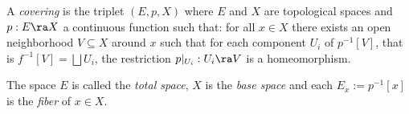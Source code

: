 \begin{defin*}
  A \emph{covering} is the triplet $(E,p,X)$ where $E$ and $X$ are topological spaces and
  $p:E\ra X$ a continuous function such that: for all $x\in X$ there exists an open
  neighborhood $V\subseteq X$ around $x$ such that for each component $U_i$ of $p^{-1}[V]$,
  that is $f^{-1}[V]=\bigsqcup U_i$, the restriction $p|_{U_i}:U_i\ra V$ is a homeomorphism.

  The space $E$ is called the \emph{total space}, $X$ is the \emph{base space} and
  each $E_x:=p^{-1}[x]$ is the \emph{fiber} of $x\in X$.
\end{defin*}